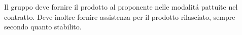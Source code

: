 Il gruppo deve fornire il prodotto al proponente nelle modalit\'a pattuite nel contratto. Deve inoltre fornire assistenza per il prodotto rilasciato, sempre secondo quanto stabilito.